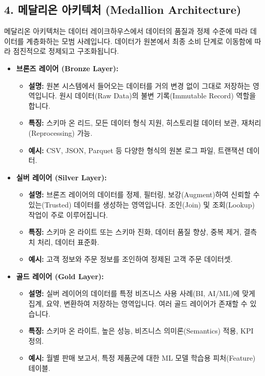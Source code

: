 \documentclass[11pt,a4paper]{article}
\theoremstyle{definition}
\begin{document}
\subsection*{4. 메달리온 아키텍처 (Medallion Architecture)}

메달리온 아키텍처는 데이터 레이크하우스에서 데이터의 품질과 정제 수준에 따라 데이터를 계층화하는 모범 사례입니다. 데이터가 원본에서 최종 소비 단계로 이동함에 따라 점진적으로 정제되고 구조화됩니다.

\begin{tcolorbox}[title=\textbf{메달리온 아키텍처의 3단계}, colback=yellow!5!white, colframe=yellow!75!black, sharp corners, boxrule=0.8pt]
\begin{itemize}
    \item \textbf{브론즈 레이어 (Bronze Layer):}
    \begin{itemize}
        \item \textbf{설명:} 원본 시스템에서 들어오는 데이터를 거의 변경 없이 그대로 저장하는 영역입니다. 원시 데이터(Raw Data)의 불변 기록(Immutable Record) 역할을 합니다.
        \item \textbf{특징:} 스키마 온 리드, 모든 데이터 형식 지원, 히스토리컬 데이터 보관, 재처리(Reprocessing) 가능.
        \item \textbf{예시:} CSV, JSON, Parquet 등 다양한 형식의 원본 로그 파일, 트랜잭션 데이터.
    \end{itemize}
    \item \textbf{실버 레이어 (Silver Layer):}
    \begin{itemize}
        \item \textbf{설명:} 브론즈 레이어의 데이터를 정제, 필터링, 보강(Augment)하여 신뢰할 수 있는(Trusted) 데이터를 생성하는 영역입니다. 조인(Join) 및 조회(Lookup) 작업이 주로 이루어집니다.
        \item \textbf{특징:} 스키마 온 라이트 또는 스키마 진화, 데이터 품질 향상, 중복 제거, 결측치 처리, 데이터 표준화.
        \item \textbf{예시:} 고객 정보와 주문 정보를 조인하여 정제된 고객 주문 데이터셋.
    \end{itemize}
    \item \textbf{골드 레이어 (Gold Layer):}
    \begin{itemize}
        \item \textbf{설명:} 실버 레이어의 데이터를 특정 비즈니스 사용 사례(BI, AI/ML)에 맞게 집계, 요약, 변환하여 저장하는 영역입니다. 여러 골드 레이어가 존재할 수 있습니다.
        \item \textbf{특징:} 스키마 온 라이트, 높은 성능, 비즈니스 의미론(Semantics) 적용, KPI 정의.
        \item \textbf{예시:} 월별 판매 보고서, 특정 제품군에 대한 ML 모델 학습용 피처(Feature) 테이블.
    \end{itemize}
\end{itemize}
\end{tcolorbox}
\end{document}
